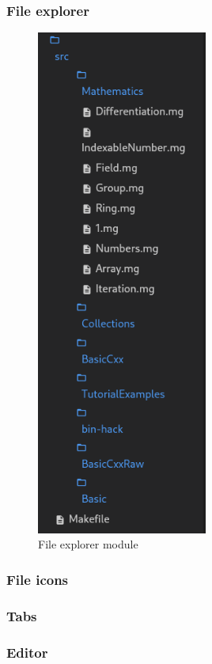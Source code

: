 \begin{frame}
  \frametitle{File explorer}
  \begin{figure}
    \centering
    \includegraphics[width=0.5\textwidth]{./pics/ide-explorer.png}
    \caption{
      File explorer module
    }
  \end{figure}
\end{frame}

\begin{frame}
  \frametitle{File icons}
\end{frame}

\begin{frame}
  \frametitle{Tabs}
\end{frame}

\begin{frame}
  \frametitle{Editor}
\end{frame}

